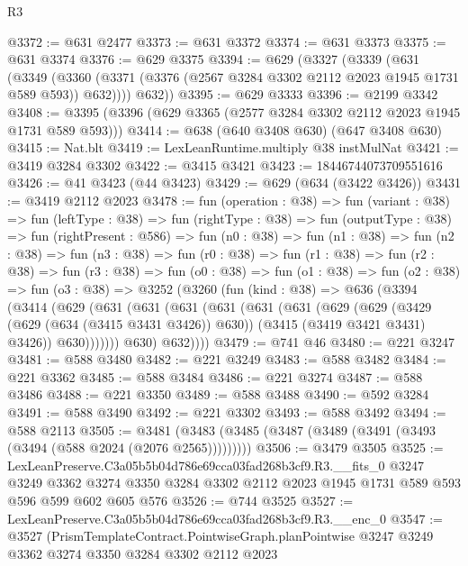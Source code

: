 \begin{lexlean}{R3}
\begin{coremodule}
@3372 := @631 @2477
@3373 := @631 @3372
@3374 := @631 @3373
@3375 := @631 @3374
@3376 := @629 @3375
@3394 := @629
    (@3327
      (@3339
        (@631
          (@3349
            (@3360 (@3371 (@3376 (@2567 @3284 @3302 @2112 @2023 @1945 @1731 @589 @593)) @632))))
        @632))
@3395 := @629 @3333
@3396 := @2199 @3342
@3408 := @3395 (@3396 (@629 @3365 (@2577 @3284 @3302 @2112 @2023 @1945 @1731 @589 @593)))
@3414 := @638 (@640 @3408 @630) (@647 @3408 @630)
@3415 := Nat.blt
@3419 := LexLeanRuntime.multiply @38 instMulNat
@3421 := @3419 @3284 @3302
@3422 := @3415 @3421
@3423 := 18446744073709551616
@3426 := @41 @3423 (@44 @3423)
@3429 := @629 (@634 (@3422 @3426))
@3431 := @3419 @2112 @2023
@3478 := fun (operation : @38) =>
  fun (variant : @38) =>
  fun (leftType : @38) =>
  fun (rightType : @38) =>
  fun (outputType : @38) =>
  fun (rightPresent : @586) =>
  fun (n0 : @38) =>
  fun (n1 : @38) =>
  fun (n2 : @38) =>
  fun (n3 : @38) =>
  fun (r0 : @38) =>
  fun (r1 : @38) =>
  fun (r2 : @38) =>
  fun (r3 : @38) =>
  fun (o0 : @38) =>
  fun (o1 : @38) =>
  fun (o2 : @38) =>
  fun (o3 : @38) =>
  @3252
    (@3260
      (fun (kind : @38) =>
      @636
        (@3394
          (@3414
            (@629
              (@631
                (@631
                  (@631
                    (@631
                      (@631
                        (@631
                          (@629
                            (@629
                              (@3429 (@629 (@634 (@3415 @3431 @3426)) @630))
                              (@3415 (@3419 @3421 @3431) @3426))
                            @630)))))))
              @630)
            @632))))
@3479 := @741 @46
@3480 := @221 @3247
@3481 := @588 @3480
@3482 := @221 @3249
@3483 := @588 @3482
@3484 := @221 @3362
@3485 := @588 @3484
@3486 := @221 @3274
@3487 := @588 @3486
@3488 := @221 @3350
@3489 := @588 @3488
@3490 := @592 @3284
@3491 := @588 @3490
@3492 := @221 @3302
@3493 := @588 @3492
@3494 := @588 @2113
@3505 := @3481 (@3483 (@3485 (@3487 (@3489 (@3491 (@3493 (@3494 (@588 @2024 (@2076 @2565)))))))))
@3506 := @3479 @3505
@3525 := LexLeanPreserve.C3a05b5b04d786e69cca03fad268b3cf9.R3.__fits_0
    @3247
    @3249
    @3362
    @3274
    @3350
    @3284
    @3302
    @2112
    @2023
    @1945
    @1731
    @589
    @593
    @596
    @599
    @602
    @605
    @576
@3526 := @744 @3525
@3527 := LexLeanPreserve.C3a05b5b04d786e69cca03fad268b3cf9.R3.__enc_0
@3547 := @3527
    (PrismTemplateContract.PointwiseGraph.planPointwise
      @3247
      @3249
      @3362
      @3274
      @3350
      @3284
      @3302
      @2112
      @2023

\end{coremodule}
\end{lexlean}
